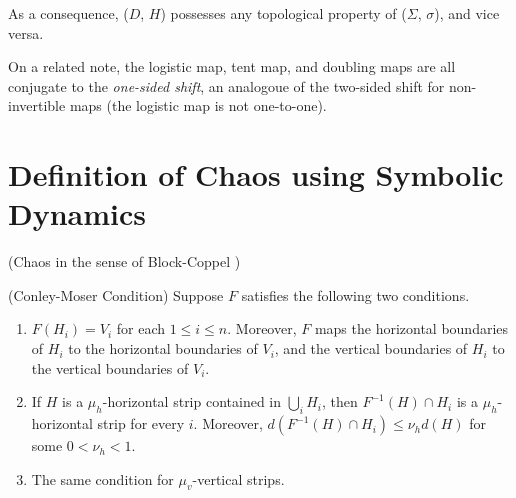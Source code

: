 \documentclass[12pt,twoside]{book}
\begin{document}
As a consequence, ($D$, $H$) possesses any topological property of ($\Sigma$, $\sigma$), and vice versa.

On a related note, the logistic map, tent map, and doubling maps are all conjugate to the \textit{one-sided shift}, an analogoue of the two-sided shift for non-invertible maps (the logistic map is not one-to-one).

\section{Definition of Chaos using Symbolic Dynamics}
\begin{definition}
  (Chaos in the sense of Block-Coppel \citep{blockcoppel})
  \label{}
\end{definition}

\begin{theorem}
  (Conley-Moser Condition)
  Suppose $F$ satisfies the following two conditions.
  \begin{enumerate}
    \item $F(H_i) = V_i$ for each $1 \leq i \leq n$.
          Moreover, $F$ maps the horizontal boundaries of $H_i$ to the horizontal boundaries of $V_i$, and the vertical boundaries of $H_i$ to the vertical boundaries of $V_i$.
    \item If $H$ is a $\mu_h$-horizontal strip contained in $\bigcup_{i} H_i$, then $F^{-1}(H) \cap H_i$ is a $\mu_h$-horizontal strip for every $i$.
          Moreover, $d(F^{-1}(H) \cap H_i) \leq \nu_h d(H)$ for some $0 < \nu_h < 1$.
    \item The same condition for $\mu_v$-vertical strips.
  \end{enumerate}
  \label{thm:conley-moser}
\end{theorem}




\printindex
\end{document}
